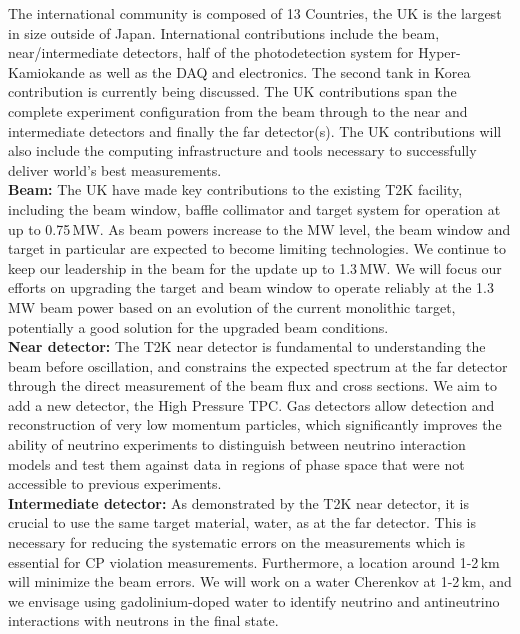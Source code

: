 \documentclass[11pt]{article}
\begin{document}
The international community is composed of 13 Countries, the UK is the
largest in size outside of Japan.  International contributions include
the beam, near/intermediate detectors, half of the photodetection system
for Hyper-Kamiokande as well as the DAQ and electronics. The second
tank in Korea contribution is currently being discussed.
The UK contributions span the complete experiment configuration from
the beam through to the near and intermediate detectors and finally
the far detector(s). The UK contributions will also include the
computing infrastructure and tools necessary to successfully deliver
world's best measurements.\\

{\bf Beam:} The UK have made key contributions to the existing T2K
facility, including the beam window, baffle collimator and target
system for operation at up to 0.75\,MW. As beam powers increase to the
MW level, the beam window and target in particular are expected to
become limiting technologies.  We continue to keep our leadership in
the beam for the update up to 1.3\,MW. We will focus our efforts on
upgrading the target and beam window to operate reliably at the
1.3\,MW beam power based on an evolution of the current monolithic
target, potentially a good solution for the upgraded beam
conditions.\\

{\bf Near detector:} The T2K near detector is fundamental to
understanding the beam before oscillation, and constrains the expected
spectrum at the far detector through the direct measurement of the
beam flux and cross sections.  We aim to add a new detector, the High
Pressure TPC.  Gas detectors allow detection and reconstruction of
very low momentum particles, which significantly improves the ability
of neutrino experiments to distinguish between neutrino interaction
models and test them against data in regions of phase space that were
not accessible to previous experiments.\\

{\bf Intermediate detector:} As demonstrated by the T2K near detector,
it is crucial to use the same target material, water, as at the far
detector. This is necessary for reducing the systematic errors on the
measurements which is essential for CP violation measurements.
Furthermore, a location around 1-2\,km will minimize the beam
errors. We will work on a water Cherenkov at 1-2\,km, and we envisage
using gadolinium-doped water to identify neutrino and antineutrino
interactions with neutrons in the final state.\\
\end{document}
